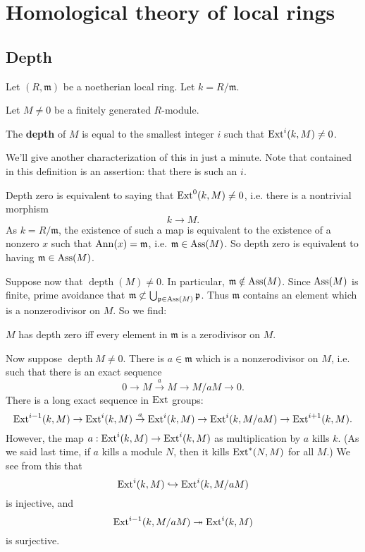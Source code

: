 \section{Homological theory of local rings}
\subsection{Depth} Let $(R, \mathfrak{m})$ be  a noetherian
local ring. Let $k = R/\mathfrak{m}$.

Let $M \neq 0$ be a finitely generated $R$-module.

\newcommand{\depth}{\operatorname{depth}}
\begin{definition}
The \textbf{depth} of $M$ is equal to the smallest integer $i$
such that
$\operatorname{Ext}^i(k,M) \neq 0$.
\end{definition}

We'll give another characterization of this in just a minute.
Note that
contained in this definition is an assertion: that there is such
an $i$.

\begin{example}
Depth zero is equivalent to saying that $\operatorname{Ext}^0(k,M) \neq 0$,
i.e. there is a
nontrivial morphism
\[ k \to M.  \]
As $k = R/\mathfrak{m}$, the existence of such a map is
equivalent to the existence of a nonzero $x$
such that $\operatorname{Ann}(x) = \mathfrak{m}$, i.e. $\mathfrak{m} \in
\operatorname{Ass}(M)$. So depth
zero is equivalent to having $\mathfrak{m} \in \operatorname{Ass}(M)$.
\end{example}

Suppose now that $\depth(M) \neq 0$. In particular,
$\mathfrak{m} \notin
\operatorname{Ass}(M)$. Since $\operatorname{Ass}(M)$ is finite, prime avoidance that
$\mathfrak{m}
\not\subset \bigcup_{\mathfrak{p} \in \operatorname{Ass}(M)} \mathfrak{p}$.
Thus
$\mathfrak{m}$ contains an element which is a nonzerodivisor on
$M$. So we find:

\begin{proposition}
$M$ has depth zero iff every element in $\mathfrak{m}$ is a
zerodivisor on $M$.
\end{proposition}

Now suppose $\depth M \neq 0$. There is $a \in \mathfrak{m}$
which is a
nonzerodivisor on $M$, i.e.  such that there is
an exact sequence
\[ 0 \to M \stackrel{a}{\to} M \to M/aM \to 0.  \]
There is a long exact sequence in $\operatorname{Ext}$ groups:
\[\operatorname{Ext}^{i-1}(k,M) \to \operatorname{Ext}^i(k,M) \stackrel{a}{\to} \operatorname{Ext}^i(k,M)
\to \operatorname{Ext}^i(k,
M/aM) \to \operatorname{Ext}^{i+1}(k,M)  .\]
However, the map $a: \operatorname{Ext}^i(k,M) \to \operatorname{Ext}^i(k,M)$ as
multiplication by $a$
kills $k$. (As we said last time, if $a$ kills a module $N$,
then it kills
$\operatorname{Ext}^*(N,M)$ for all $M$.) We see from this that
\[ \operatorname{Ext}^i(k,M) \hookrightarrow \operatorname{Ext}^i(k,M/aM)  \]
is injective, and
\[ \operatorname{Ext}^{i-1}(k, M/aM) \twoheadrightarrow \operatorname{Ext}^i(k,M)  \]
is surjective.

